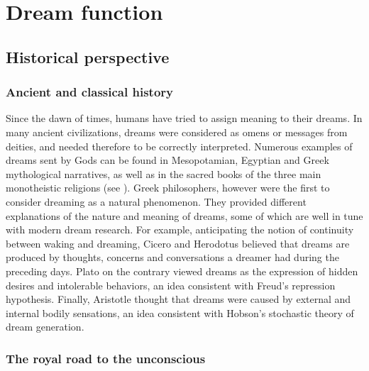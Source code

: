 \cleardoublepage

\chapter{Dream function}
\label{sec:dream-function}


\section{Historical perspective}
\label{sec:dream-func:history}

\subsection{Ancient and classical history}
\label{sec:dream-func:history:ancient}

Since the dawn of times, humans have tried to assign meaning to their dreams. In many ancient civilizations, dreams were considered as omens or messages from deities, and needed therefore to be correctly interpreted. Numerous examples of dreams sent by Gods can be found in Mesopotamian, Egyptian and Greek mythological narratives, as well as in the sacred books of the three main monotheistic religions (see \citealp{de_koninck_sleep_2012}). Greek philosophers, however were the first to consider dreaming as a natural phenomenon. They provided different explanations of the nature and meaning of dreams, some of which are well in tune with modern dream research. For example, anticipating the notion of continuity between waking and dreaming, Cicero and Herodotus believed that dreams are produced by thoughts, concerns and conversations a dreamer had during the preceding days. Plato on the contrary viewed dreams as the expression of hidden desires and intolerable behaviors, an idea consistent with Freud’s repression hypothesis. Finally, Aristotle thought that dreams were caused by external and internal bodily sensations, an idea consistent with Hobson’s stochastic theory of dream generation.

\subsection{The royal road to the unconscious}
\label{sec:dream-func:history:psychanalysis}

